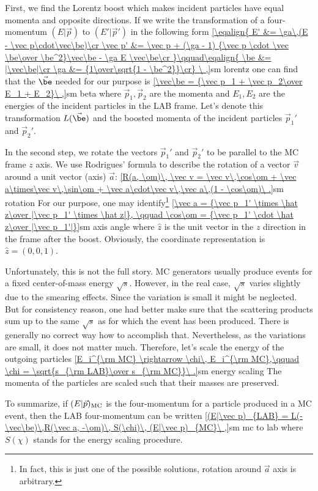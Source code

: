 First, we find the Lorentz boost which makes incident particles have equal momenta and opposite directions. If we write the transformation of a four-momentum $(E|\vec p)$ to $(E'|\vec p')$ in the following form
\eqref{\eqalign{
E'      &= \ga\,(E - \vec p\cdot\vec\be)\cr
\vec p' &= \vec p  +  (\ga - 1) {\vec p \cdot \vec \be\over \be^2}\vec\be - \ga E \vec\be\cr
}\qquad\eqalign{
\be &= |\vec\be|\cr
\ga &= {1\over\sqrt{1 - \be^2}}\cr}
\ ,}{sm lorentz}
one can find that the $\vec\be$ needed for our purpose is
\eqref{\vec\be = {\vec p_1 + \vec p_2\over E_1 + E_2}\ ,}{sm beta}
where $\vec p_1, \vec p_2$ are the momenta and $E_1, E_2$ are the energies of the incident particles in the LAB frame. Let's denote this transformation $L(\vec\be)$ and the boosted momenta of the incident particles $\vec p_1'$ and $\vec p_2'$.

In the second step, we rotate the vectors $\vec p_1'$ and $\vec p_2'$ to be parallel to the MC frame $z$ axis. We use Rodrigues' formula to describe the rotation of a vector $\vec v$ around a unit vector (axis) $\vec a$:
\eqref{R(a, \om)\, \vec v = \vec v\,\cos\om + \vec a\times\vec v\,\sin\om + \vec a\cdot\vec v\,\vec a\,(1 - \cos\om)\ .}{sm rotation}
For our purpose, one may identify\footnote{In fact, this is just one of the possible solutions, rotation around $\vec a$ axis is arbitrary.}
\eqref{\vec a = {\vec p_1' \times \hat z\over |\vec p_1' \times \hat z|}, \qquad \cos\om = {\vec p_1' \cdot \hat z\over |\vec p_1'|}}{sm axis angle}
where $\hat z$ is the unit vector in the $z$ direction in the frame after the boost. Obviously, the coordinate representation is $\hat z = (0, 0, 1)$.

Unfortunately, this is not the full story. MC generators usually produce events for a fixed center-of-mass energy $\sqrt{s}$. However, in the real case, $\sqrt{s}$ varies slightly due to the smearing effects. Since the variation is small it might be neglected. But for consistency reason, one had better make sure that the scattering products sum up to the same $\sqrt{s}$ as for which the event has been produced. There is generally no correct way how to accomplish that. Nevertheless, as the variations are small, it does not matter much. Therefore, let's scale the energy of the outgoing particles
\eqref{E_i^{\rm MC} \rightarrow \chi\, E_i^{\rm MC},\qquad \chi = \sqrt{s_{\rm LAB}\over s_{\rm MC}}\ .}{sm energy scaling}
The momenta of the particles are scaled such that their masses are preserved.

To summarize, if $(E|\vec p)_{\rm MC}$ is the four-momentum for a particle produced in a MC event, then the LAB four-momentum can be written
\eqref{(E|\vec p)_{LAB} = L(-\vec\be)\,R(\vec a, -\om)\, S(\chi)\, (E|\vec p)_{MC}\ ,}{sm mc to lab}
where $S(\chi)$ stands for the energy scaling procedure.


